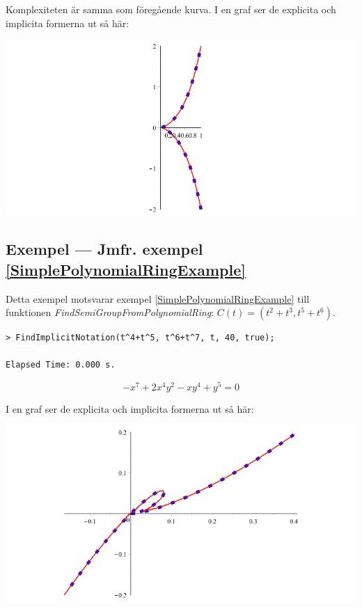 Komplexiteten är samma som föregående kurva. I en graf ser de explicita och implicita formerna ut så här:

\begin{center}
	\includegraphics[scale=0.35]{Export/implicitplot3.png}
\end{center}

\subsection{Exempel --- Jmfr. exempel \ref{SimplePolynomialRingExample}}

Detta exempel motsvarar exempel \ref{SimplePolynomialRingExample} till funktionen \emph{FindSemiGroupFromPolynomialRing}: $C(t)=\left(t^2+t^3,t^5+t^6\right)$.

\begin{verbatim}
> FindImplicitNotation(t^4+t^5, t^6+t^7, t, 40, true);

Elapsed Time: 0.000 s.
\end{verbatim}
\[-x^7+2x^4y^2-xy^4+y^5 = 0\]

I en graf ser de explicita och implicita formerna ut så här:

\begin{center}
	\includegraphics[scale=0.35]{Export/implicitplot4.png}
\end{center}

